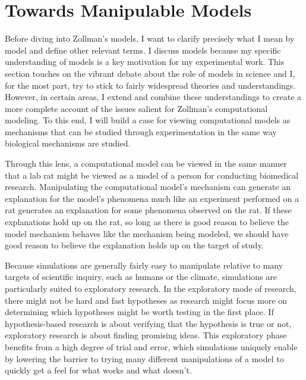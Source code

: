 \hypertarget{towards-manipulable-models}{%
\chapter{Towards Manipulable Models}\label{towards-manipulable-models}}

\usetikzlibrary{positioning,arrows,calc}

Before diving into Zollman's models, I want to clarify precisely what I
mean by model and define other relevant terms. I discuss models because
my specific understanding of models is a key motivation for my
experimental work. This section touches on the vibrant debate about the
role of models in science and I, for the most part, try to stick to
fairly widespread theories and understandings. However, in certain
areas, I extend and combine these understandings to create a more
complete account of the issues salient for Zollman's computational
modeling. To this end, I will build a case for viewing computational
models as mechanisms that can be studied through experimentation in the
same way biological mechanisms are studied.

Through this lens, a computational model can be viewed in the same
manner that a lab rat might be viewed as a model of a person for
conducting biomedical research. Manipulating the computational model's
mechanism can generate an explanation for the model's phenomena much
like an experiment performed on a rat generates an explanation for some
phenomena observed on the rat. If these explanations hold up on the rat,
so long as there is good reason to believe the model mechanism behaves
like the mechanism being modeled, we should have good reason to believe
the explanation holds up on the target of study.

Because simulations are generally fairly easy to manipulate relative to
many targets of scientific inquiry, such as humans or the climate,
simulations are particularly suited to exploratory research. In the
exploratory mode of research, there might not be hard and fast
hypotheses as research might focus more on determining which hypotheses
might be worth testing in the first place. If hypothesis-based research
is about verifying that the hypothesis is true or not, exploratory
research is about finding promising ideas. This exploratory phase
benefits from a high degree of trial and error, which simulations
uniquely enable by lowering the barrier to trying many different
manipulations of a model to quickly get a feel for what works and what
doesn't.

